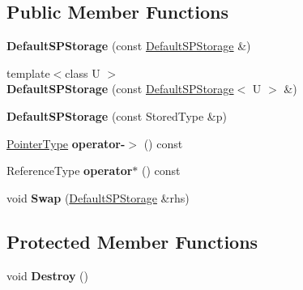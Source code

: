 \subsection*{Public Member Functions}
\begin{DoxyCompactItemize}
\item 
\hypertarget{classLoki_1_1DefaultSPStorage_a6513a59b69da9bcb7984560b7110fc7b}{}{\bfseries Default\+S\+P\+Storage} (const \hyperlink{classLoki_1_1DefaultSPStorage}{Default\+S\+P\+Storage} \&)\label{classLoki_1_1DefaultSPStorage_a6513a59b69da9bcb7984560b7110fc7b}

\item 
\hypertarget{classLoki_1_1DefaultSPStorage_a9b33b1cc3a9ccb3afc639a8fc9086b3c}{}{\footnotesize template$<$class U $>$ }\\{\bfseries Default\+S\+P\+Storage} (const \hyperlink{classLoki_1_1DefaultSPStorage}{Default\+S\+P\+Storage}$<$ U $>$ \&)\label{classLoki_1_1DefaultSPStorage_a9b33b1cc3a9ccb3afc639a8fc9086b3c}

\item 
\hypertarget{classLoki_1_1DefaultSPStorage_adb822d71c6d5e0a08e4474fedde56c32}{}{\bfseries Default\+S\+P\+Storage} (const Stored\+Type \&p)\label{classLoki_1_1DefaultSPStorage_adb822d71c6d5e0a08e4474fedde56c32}

\item 
\hypertarget{classLoki_1_1DefaultSPStorage_a0976e5f2586c167a777ed8960c7e85a2}{}\hyperlink{classLoki_1_1DefaultSPStorage_a70074a5e2fe5b95668d4e5bb0f0909a8}{Pointer\+Type} {\bfseries operator-\/$>$} () const \label{classLoki_1_1DefaultSPStorage_a0976e5f2586c167a777ed8960c7e85a2}

\item 
\hypertarget{classLoki_1_1DefaultSPStorage_a6c058f8d14f3173f4c4fc86999b01e98}{}Reference\+Type {\bfseries operator$\ast$} () const \label{classLoki_1_1DefaultSPStorage_a6c058f8d14f3173f4c4fc86999b01e98}

\item 
\hypertarget{classLoki_1_1DefaultSPStorage_a633294c97c06f47b4a62fbd1c778e9ab}{}void {\bfseries Swap} (\hyperlink{classLoki_1_1DefaultSPStorage}{Default\+S\+P\+Storage} \&rhs)\label{classLoki_1_1DefaultSPStorage_a633294c97c06f47b4a62fbd1c778e9ab}

\end{DoxyCompactItemize}
\subsection*{Protected Member Functions}
\begin{DoxyCompactItemize}
\item 
\hypertarget{classLoki_1_1DefaultSPStorage_a092050b0ffa6abae473177cbf0b45001}{}void {\bfseries Destroy} ()\label{classLoki_1_1DefaultSPStorage_a092050b0ffa6abae473177cbf0b45001}

\end{DoxyCompactItemize}
